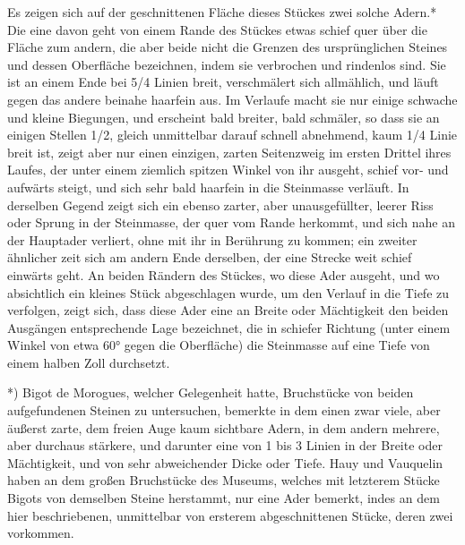\documentclass[a4paper, 11pt, oneside, german]{article}
\begin{document}
Es zeigen sich auf der geschnittenen Fläche dieses Stückes zwei solche Adern.* Die eine davon geht von einem Rande des Stückes etwas schief quer über die Fläche zum andern, die aber beide nicht die Grenzen des ursprünglichen Steines und dessen Oberfläche bezeichnen, indem sie verbrochen und rindenlos sind. Sie ist an einem Ende bei 5/4 Linien breit, verschmälert sich allmählich, und läuft gegen das andere beinahe haarfein aus. Im Verlaufe macht sie nur einige schwache und kleine Biegungen, und erscheint bald breiter, bald schmäler, so dass sie an einigen Stellen 1/2, gleich unmittelbar darauf schnell abnehmend, kaum 1/4 Linie breit ist, zeigt aber nur einen einzigen, zarten Seitenzweig im ersten Drittel ihres Laufes, der unter einem ziemlich spitzen Winkel von ihr ausgeht, schief vor- und aufwärts steigt, und sich sehr bald haarfein in die Steinmasse verläuft. In derselben Gegend zeigt sich ein ebenso zarter, aber unausgefüllter, leerer Riss oder Sprung in der Steinmasse, der quer vom Rande herkommt, und sich nahe an der Hauptader verliert, ohne mit ihr in Berührung zu kommen; ein zweiter ähnlicher zeit sich am andern Ende derselben, der eine Strecke weit schief einwärts geht. An beiden Rändern des Stückes, wo diese Ader ausgeht, und wo absichtlich ein kleines Stück abgeschlagen wurde, um den Verlauf in die Tiefe zu verfolgen, zeigt sich, dass diese Ader eine an Breite oder Mächtigkeit den beiden Ausgängen entsprechende Lage bezeichnet, die in schiefer Richtung (unter einem Winkel von etwa 60° gegen die Oberfläche) die Steinmasse auf eine Tiefe von einem halben Zoll durchsetzt.

*) Bigot de Morogues, welcher Gelegenheit hatte, Bruchstücke von beiden aufgefundenen Steinen zu untersuchen, bemerkte in dem einen zwar viele, aber äußerst zarte, dem freien Auge kaum sichtbare Adern, in dem andern mehrere, aber durchaus stärkere, und darunter eine von 1 bis 3 Linien in der Breite oder Mächtigkeit, und von sehr abweichender Dicke oder Tiefe. Hauy und Vauquelin haben an dem großen Bruchstücke des Museums, welches mit letzterem Stücke Bigots von demselben Steine herstammt, nur eine Ader bemerkt, indes an dem hier beschriebenen, unmittelbar von ersterem abgeschnittenen Stücke, deren zwei vorkommen.
\end{document}
